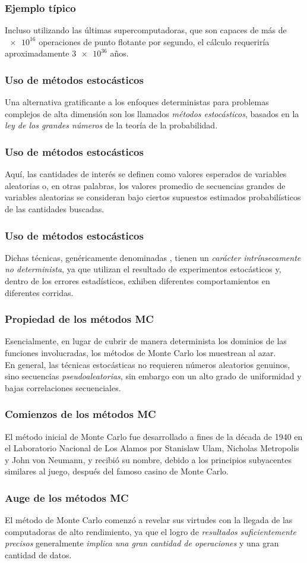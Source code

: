 \begin{frame}
\frametitle{Ejemplo típico}
Incluso utilizando las últimas supercomputadoras, que son capaces de más de $\num{e16}$ operaciones de punto flotante por segundo, el cálculo requeriría aproximadamente $\num{3e36}$ años.
\end{frame}
\begin{frame}
\frametitle{Uso de métodos estocásticos}
Una alternativa gratificante a los enfoques deterministas para problemas complejos de alta dimensión son los llamados \emph{métodos estocásticos}, basados en la \emph{ley de los grandes números} de la teoría de la probabilidad.
\end{frame}
\begin{frame}
\frametitle{Uso de métodos estocásticos}
Aquí, las cantidades de interés se definen como valores esperados de variables aleatorias o, en otras palabras, los valores promedio de secuencias grandes de variables aleatorias se consideran bajo ciertos supuestos estimados probabilísticos de las cantidades buscadas.
\end{frame}
\begin{frame}
\frametitle{Uso de métodos estocásticos}
Dichas técnicas, genéricamente denominadas , tienen un \emph{carácter intrínsecamente no determinista}, ya que utilizan el resultado de experimentos estocásticos y, dentro de los errores estadísticos, exhiben diferentes comportamientos en diferentes corridas.
\end{frame}
\begin{frame}
\frametitle{Propiedad de los métodos MC}
Esencialmente, en lugar de cubrir de manera determinista los dominios de las funciones involucradas, los métodos de Monte Carlo los muestrean al azar.
\\
\bigskip
En general, las técnicas estocásticas no requieren números aleatorios genuinos, sino secuencias \emph{pseudoaleatorias}, sin embargo con un alto grado de uniformidad y bajas correlaciones secuenciales.
\end{frame}
\begin{frame}
\frametitle{Comienzos de los métodos MC}
El método inicial de Monte Carlo fue desarrollado a fines de la década de 1940 en el Laboratorio Nacional de Los Alamos por Stanislaw Ulam, Nicholas Metropolis y John von Neumann, y recibió su nombre, debido a los principios subyacentes similares al juego, después del famoso casino de Monte Carlo.
\end{frame}
\begin{frame}
\frametitle{Auge de los métodos MC}
El método de Monte Carlo comenzó a revelar sus virtudes con la llegada de las computadoras de alto rendimiento, ya que el logro de \emph{resultados suficientemente precisos} generalmente \emph{implica una gran cantidad de operaciones} y una gran cantidad de datos.
\end{frame}
